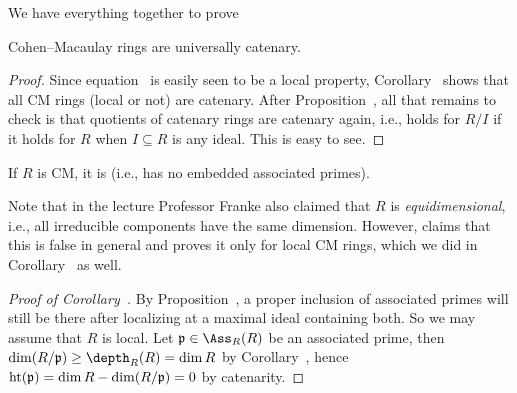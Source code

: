 \documentclass[a4paper,parskip=half,numbers=enddot, DIV=12]{scrreprt}
\begin{document}
We have everything together to prove
\begin{thm}
	Cohen--Macaulay rings are universally catenary.
\end{thm}
\begin{proof}
	Since equation~ is easily seen to be a local property, Corollary~ shows that all CM rings (local or not) are catenary. After Proposition~, all that remains to check is that quotients of catenary rings are catenary again, i.e.,  holds for $R/I$ if it holds for $R$ when $I\subseteq R$ is any ideal. This is easy to see. 
\end{proof}
\begin{cor}
	If $R$ is CM, it is  (i.e., has no embedded associated primes).
\end{cor}
\begin{rem*}
	Note that in the lecture Professor Franke also claimed that $R$ is \emph{equidimensional}, i.e., all irreducible components have the same dimension. However, \cite[p.\ 458]{eisenbudCommAlg} claims that this is false in general and proves it only for local CM rings, which we did in Corollary~ as well.
\end{rem*}
\begin{proof}[Proof of Corollary~]
	By Proposition~, a proper inclusion of associated primes will still be there after localizing at a maximal ideal containing both. So we may assume that $R$ is local. Let $\pp\in\Ass_R(R)$ be an associated prime, then $\dim(R/\pp)\geq\depth_R(R)=\dim R$ by Corollary~, hence $\operatorname{ht}(\mathfrak{p})=\dim R-\dim (R/\mathfrak{p})=0$ by catenarity. 
\end{proof}
\end{document}
